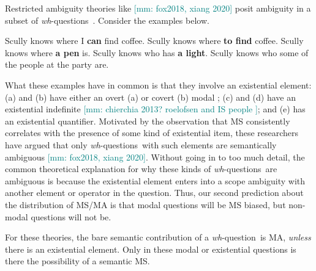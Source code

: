 \documentclass[12pt,letterpaper,table,svgnames,dvipsnames]{article}
\newcommand{\mm}[1]{\textcolor{teal}{[mm: #1]}}
\newcommand{\whq}{\emph{wh}-question~}
\newcommand{\whqs}{\emph{wh}-questions~}
\begin{document}
Restricted ambiguity theories like \mm{fox2018, xiang 2020} posit ambiguity in a subset of \whqs$\!$. Consider the examples below. 
\begin{exe}
\ex {} \label{existentials}
    \begin{xlist}
        \ex Scully knows where I \textbf{can} find coffee.
        \ex Scully knows where \textbf{to find} coffee.
        \ex Scully knows where \textbf{a pen} is.
        \ex Scully knows who has \textbf{a light}.
        \ex Scully knows who some of the people at the party are.
    \end{xlist}
\end{exe}
What these examples have in common is that they involve an existential element: (a) and (b) have either an overt (a) or covert (b) modal \cite{bhatt1999,dayal2016,xiang2016,george2011,nicolae2014,fox2014}; (c) and (d) have an existential indefinite \cite{groenstok1982, groenstok1984,vanrooij2003,vanrooij2004} \mm{chierchia 2013? roelofsen and IS people }; and (e) has an existential quantifier. Motivated by the observation that MS consistently correlates with the presence of some kind of existential item, these researchers have argued that only \whqs with such elements are semantically ambiguous \cite[Ch:6]{nicolae2014,fox2014,xiang2016,george2011}\mm{fox2018, xiang 2020}. Without going in to too much detail, the common theoretical explanation for why these kinds of \whqs are ambiguous is because the existential element enters into a scope ambiguity with another element or operator in the question. Thus, our second prediction about the distribution of MS/MA is that modal questions will be MS biased, but non-modal questions will not be.

For these theories, the bare semantic contribution of a \whq is MA, \emph{unless} there is an existential element. Only in these modal or existential questions is there the possibility of a semantic MS.
\end{document}
